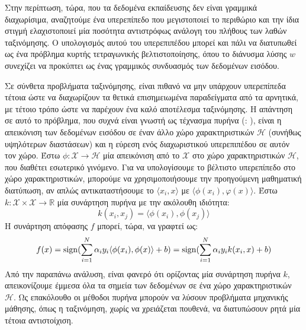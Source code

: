 Στην περίπτωση, τώρα, που τα δεδομένα εκπαίδευσης δεν είναι γραμμικά διαχωρίσιμα, αναζητούμε ένα υπερεπίπεδο που μεγιστοποιεί το περιθώριο και την ίδια στιγμή ελαχιστοποιεί μία ποσότητα αντιστρόφως ανάλογη του πλήθους των λαθών ταξινόμησης.
Ο υπολογισμός αυτού του υπερεπιπέδου μπορεί και πάλι να διατυπωθεί ως ένα πρόβλημα κυρτής τετραγωνικής βελτιστοποίησης, όπου το διάνυσμα λύσης $w$ συνεχίζει να προκύπτει ως ένας γραμμικός συνδυασμός των δεδομένων εισόδου.\par
Σε σύνθετα προβλήματα ταξινόμησης, είναι πιθανό να μην υπάρχουν υπερεπίπεδα τέτοια ώστε να διαχωρίζουν τα θετικά επισημειωμένα παραδείγματα από τα αρνητικά, με τέτοιο τρόπο ώστε να παρέχουν ένα καλό αποτέλεσμα ταξινόμησης.
Η απάντηση σε αυτό το πρόβλημα, που συχνά είναι γνωστή ως τέχνασμα πυρήνα (: \cite{Aizerman67theoretical, Boser1992}), είναι η απεικόνιση των δεδομένων εισόδου σε έναν άλλο χώρο χαρακτηριστικών $\mathcal{H}$ (συνήθως υψηλότερων διαστάσεων) και η εύρεση ενός διαχωριστικού υπερεπιπέδου σε αυτόν τον χώρο.
Έστω $\mathcal{\phi} : \mathcal{X} \rightarrow \mathcal{H}$ μία απεικόνιση από το $\mathcal{X}$ στο χώρο χαρακτηριστικών $\mathcal{H}$, που διαθέτει εσωτερικό γινόμενο.
Για να υπολογίσουμε το βέλτιστο υπερεπίπεδο στο χώρο χαρακτηριστικών, μπορούμε να χρησιμοποιήσουμε την προηγούμενη μαθηματική διατύπωση, αν απλώς αντικαταστήσουμε το $\langle x_{i} , x \rangle$ με $\langle \phi(x_{i}), φ(x) \rangle$.
Έστω $k : \mathcal{X} \times \mathcal{X} \rightarrow \mathbb{R}$ μία συνάρτηση πυρήνα με την ακόλουθη ιδιότητα:
\begin{equation}
k(x_{i}, x_{j}) = \langle \phi (x_{i}), \phi (x_{j}) \rangle    
\end{equation}
Η συνάρτηση απόφασης $f$ μπορεί, τώρα, να γραφτεί ως:
\begin{equation}
f(x) = \operatorname{sign}(\sum_{i=1}^{N}\alpha_{i} y_{i} \langle \phi(x_{i}), \phi(x) \rangle + b ) = \operatorname{sign}(\sum_{i=1}^{N}\alpha_{i}y_{i} k(x_{i}, x) + b)
\end{equation}
Από την παραπάνω ανάλυση, είναι φανερό ότι ορίζοντας μία συνάρτηση πυρήνα $k$, απεικονίζουμε έμμεσα όλα τα σημεία των δεδομένων σε ένα χώρο χαρακτηριστικών $\mathcal{H}$. 
Ως επακόλουθο οι μέθοδοι πυρήνα μπορούν να λύσουν προβλήματα μηχανικής μάθησης, όπως η ταξινόμηση, χωρίς να χρειάζεται πουθενά, να διατυπώσουν ρητά μία τέτοια αντιστοίχιση.

